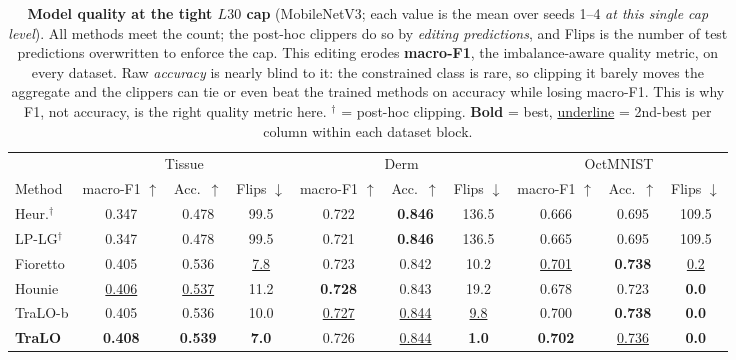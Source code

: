 \begin{table}[t]\centering\small
\caption{\textbf{Model quality at the tight $L30$ cap} (MobileNetV3; each value is the mean over seeds 1--4 \emph{at this single cap level}). All methods meet the count; the post-hoc clippers do so by \emph{editing predictions}, and Flips is the number of test predictions overwritten to enforce the cap. This editing erodes \textbf{macro-F1}, the imbalance-aware quality metric, on every dataset. Raw \emph{accuracy} is nearly blind to it: the constrained class is rare, so clipping it barely moves the aggregate and the clippers can tie or even beat the trained methods on accuracy while losing macro-F1. This is why F1, not accuracy, is the right quality metric here. $^{\dagger}$ = post-hoc clipping. \textbf{Bold} = best, \underline{underline} = 2nd-best per column within each dataset block.}
\label{tab:deploy}
\vspace{5pt}
\begin{tabular}{l ccc ccc ccc}
\toprule
 & \multicolumn{3}{c}{Tissue} & \multicolumn{3}{c}{Derm} & \multicolumn{3}{c}{OctMNIST} \\
\cmidrule(lr){2-4}\cmidrule(lr){5-7}\cmidrule(lr){8-10}
Method & macro-F1 $\uparrow$ & Acc.\ $\uparrow$ & Flips $\downarrow$ & macro-F1 $\uparrow$ & Acc.\ $\uparrow$ & Flips $\downarrow$ & macro-F1 $\uparrow$ & Acc.\ $\uparrow$ & Flips $\downarrow$ \\
\midrule
Heur.$^{\dagger}$  & 0.347 & 0.478 & 99.5 & 0.722 & \textbf{0.846} & 136.5 & 0.666 & 0.695 & 109.5 \\
LP-LG$^{\dagger}$ & 0.347 & 0.478 & 99.5 & 0.721 & \textbf{0.846} & 136.5 & 0.665 & 0.695 & 109.5 \\
Fioretto           & 0.405 & 0.536 & \underline{7.8} & 0.723 & 0.842 & 10.2 & \underline{0.701} & \textbf{0.738} & \underline{0.2} \\
Hounie             & \underline{0.406} & \underline{0.537} & 11.2 & \textbf{0.728} & 0.843 & 19.2 & 0.678 & 0.723 & \textbf{0.0} \\
TraLO-b            & 0.405 & 0.536 & 10.0 & \underline{0.727} & \underline{0.844} & \underline{9.8} & 0.700 & \textbf{0.738} & \textbf{0.0} \\
\textbf{TraLO}     & \textbf{0.408} & \textbf{0.539} & \textbf{7.0} & 0.726 & \underline{0.844} & \textbf{1.0} & \textbf{0.702} & \underline{0.736} & \textbf{0.0} \\
\bottomrule
\end{tabular}
\end{table}
